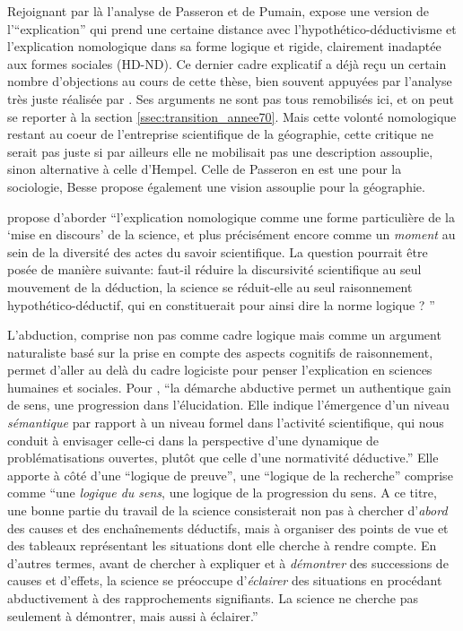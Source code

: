 Rejoignant par là l'analyse de Passeron et de Pumain, \textcite{Besse2000} expose une version de l'\enquote{explication} qui prend une certaine distance avec l'hypothético-déductivisme et l'explication nomologique dans sa forme logique et rigide, clairement inadaptée aux formes sociales (HD-ND). Ce dernier cadre explicatif a déjà reçu un certain nombre d'objections au cours de cette thèse, bien souvent appuyées par l'analyse très juste réalisée par \textcite{Besse2000}. Ses arguments ne sont pas tous remobilisés ici, et on peut se reporter à la section \ref{ssec:transition_annee70}. Mais cette volonté nomologique restant au coeur de l'entreprise scientifique de la géographie, cette critique ne serait pas juste si par ailleurs elle ne mobilisait pas une description assouplie, sinon alternative à celle d'Hempel. Celle de Passeron en est une pour la sociologie, Besse propose également une vision assouplie pour la géographie.

\textcite{Besse2000} propose d'aborder \enquote{l'explication nomologique comme une forme particulière de la \enquote{mise en discours} de la science, et plus précisément encore comme un \textit{moment} au sein de la diversité des actes du savoir scientifique. La question pourrait être posée de manière suivante: faut-il réduire la discursivité scientifique au seul mouvement de la déduction, la science se réduit-elle au seul raisonnement hypothético-déductif, qui en constituerait pour ainsi dire la norme logique ? }

L'abduction, comprise non pas comme cadre logique mais comme un argument naturaliste basé sur la prise en compte des aspects cognitifs de raisonnement, permet d'aller au delà du cadre logiciste pour penser l'explication en sciences humaines et sociales. Pour \textcite{Besse2000}, \enquote{la démarche abductive permet un authentique gain de sens, une progression dans l'élucidation. Elle indique l'émergence d'un niveau \textit{sémantique} par rapport à un niveau formel dans l'activité scientifique, qui nous conduit à envisager celle-ci dans la perspective d'une dynamique de problématisations ouvertes, plutôt que celle d'une normativité déductive.} Elle apporte à côté d'une \enquote{logique de preuve}, une \enquote{logique de la recherche} comprise comme \enquote{une \textit{logique du sens}, une logique de la progression du sens. A ce titre, une bonne partie du travail de la science consisterait non pas à chercher d'\textit{abord} des causes et des enchaînements déductifs, mais à organiser des points de vue et des tableaux représentant les situations dont elle cherche à rendre compte. En d'autres termes, avant de chercher à expliquer et à \textit{démontrer} des successions de causes et d'effets, la science se préoccupe d'\textit{éclairer} des situations en procédant abductivement à des rapprochements signifiants. La science ne cherche pas seulement à démontrer, mais aussi à éclairer.}

